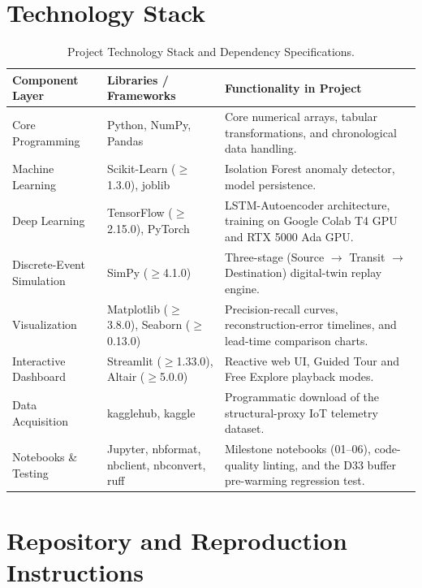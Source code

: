 \documentclass[11pt,a4paper,oneside]{report}
\begin{document}
\appendix

\chapter{Technology Stack}
\label{chap:tech_stack}

\begin{table}[H]
\centering
\caption{Project Technology Stack and Dependency Specifications.}
\label{tab:tech_stack}
\small
\begin{tabularx}{\textwidth}{L{3.2cm} L{3.6cm} Y}
\toprule
\textbf{Component Layer} & \textbf{Libraries / Frameworks} & \textbf{Functionality in Project} \\
\midrule
Core Programming & Python, NumPy, Pandas & Core numerical arrays, tabular transformations, and chronological data handling. \\
Machine Learning & Scikit-Learn ($\geq$1.3.0), joblib & Isolation Forest anomaly detector, model persistence. \\
Deep Learning & TensorFlow ($\geq$2.15.0), PyTorch & LSTM-Autoencoder architecture, training on Google Colab T4 GPU and RTX 5000 Ada GPU. \\
Discrete-Event Simulation & SimPy ($\geq$4.1.0) & Three-stage (Source $\rightarrow$ Transit $\rightarrow$ Destination) digital-twin replay engine. \\
Visualization & Matplotlib ($\geq$3.8.0), Seaborn ($\geq$0.13.0) & Precision-recall curves, reconstruction-error timelines, and lead-time comparison charts. \\
Interactive Dashboard & Streamlit ($\geq$1.33.0), Altair ($\geq$5.0.0) & Reactive web UI, Guided Tour and Free Explore playback modes. \\
Data Acquisition & kagglehub, kaggle & Programmatic download of the structural-proxy IoT telemetry dataset. \\
Notebooks \& Testing & Jupyter, nbformat, nbclient, nbconvert, ruff & Milestone notebooks (01--06), code-quality linting, and the D33 buffer pre-warming regression test. \\
\bottomrule
\end{tabularx}
\end{table}

\chapter[Reproduction Instructions]{Repository and Reproduction Instructions}
\label{chap:reproduction}
\end{document}

